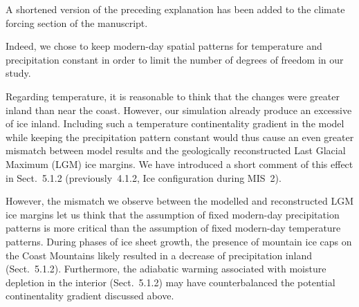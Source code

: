 A shortened version of the preceding explanation has been added to the climate
forcing section of the manuscript.


Indeed, we chose to keep modern-day spatial patterns for temperature and
precipitation constant in order to limit the number of degrees of freedom in
our study.

Regarding temperature, it is reasonable to think that the changes were greater
inland than near the coast. However, our simulation already produce an
excessive of ice inland. Including such a temperature continentality gradient
in the model while keeping the precipitation pattern constant would thus cause
an even greater mismatch between model results and the geologically
reconstructed Last Glacial Maximum (LGM) ice margins. We have introduced a
short comment of this effect in Sect.~5.1.2 (previously~4.1.2, Ice
configuration during MIS~2).

However, the mismatch we observe between the modelled and reconstructed LGM ice
margins let us think that the assumption of fixed modern-day precipitation
patterns is more critical than the assumption of fixed modern-day temperature
patterns. During phases of ice sheet growth, the presence of mountain ice caps
on the Coast Mountains likely resulted in a decrease of precipitation inland
(Sect.~5.1.2). Furthermore, the adiabatic warming associated with moisture
depletion in the interior (Sect.~5.1.2) may have counterbalanced the potential
continentality gradient discussed above.


